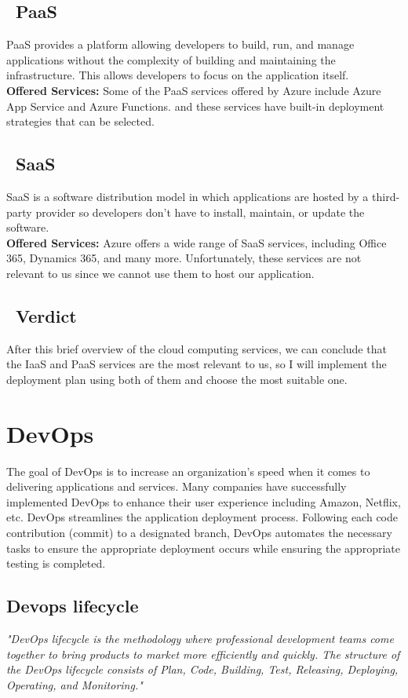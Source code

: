 \subsection*{ \textbullet\ PaaS}
\noindent
PaaS provides a platform allowing developers to build, run, and manage applications without the complexity of building and maintaining the infrastructure. This allows developers to focus on the application itself.
\noindent \\
\textbf{Offered Services:} Some of the PaaS services offered by Azure include Azure App Service and Azure Functions. and these services have built-in deployment strategies that can be selected.
\subsection*{ \textbullet\ SaaS}
\noindent
SaaS is a software distribution model in which applications are hosted by a third-party provider so developers don't have to install, maintain, or update the software.
\noindent \\
\textbf{Offered Services:} Azure offers a wide range of SaaS services, including Office 365, Dynamics 365, and many more. Unfortunately, these services are not relevant to us since we cannot use them to host our application.
\subsection*{ \textbullet\ Verdict}
After this brief overview of the cloud computing services, we can conclude that the IaaS and PaaS services are the most relevant to us, so I will implement the deployment plan using both of them and choose the most suitable one.

\section{DevOps}
The goal of DevOps is to increase an organization's speed when it comes to delivering applications and services. Many companies have successfully implemented DevOps to enhance their user experience including Amazon, Netflix, etc.
DevOps streamlines the application deployment process. Following each code contribution (commit) to a designated branch, DevOps automates the necessary tasks to ensure the appropriate deployment occurs while ensuring the appropriate testing is completed.
\subsection{Devops lifecycle}
\emph{"DevOps lifecycle is the methodology where professional development teams come together to bring products to market more efficiently and quickly. The structure of the DevOps lifecycle consists of Plan, Code, Building, Test, Releasing, Deploying, Operating,  and Monitoring."} \cite{introDevOps}

